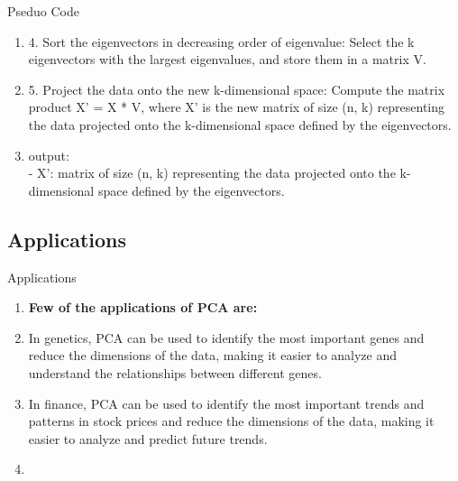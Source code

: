 \documentclass{beamer}
\begin{document}
\begin{frame}{Pseduo Code}
    \begin{enumerate}
        \item 4. Sort the eigenvectors in decreasing order of eigenvalue: Select the k eigenvectors with the largest eigenvalues, and store them in a matrix V.
        \item 5. Project the data onto the new k-dimensional space: Compute the matrix product X' = X * V, where X' is the new matrix of size (n, k) representing the data projected onto the k-dimensional space defined by the eigenvectors.
        \item output:\\
              - X': matrix of size (n, k) representing the data projected onto the k-dimensional space defined by the eigenvectors.

    \end{enumerate}
\end{frame}

\subsection{Applications}
\begin{frame}{Applications}
    \begin{enumerate}
        \item \textbf{Few of the applications of PCA are:}
        \item In genetics, PCA can be used to identify the most important genes and reduce the dimensions of the data, making it easier to analyze and understand the relationships between different genes.
        \item In finance, PCA can be used to identify the most important trends and patterns in stock prices and reduce the dimensions of the data, making it easier to analyze and predict future trends.
        \item 
    \end{enumerate}
\end{frame}
\end{document}
